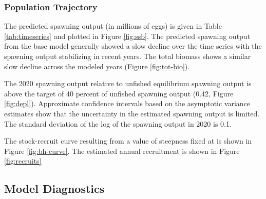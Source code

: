 \documentclass[11pt,
  english,
  a4paper,
]{article}
\begin{document}
\leavevmode\tagmcend\tagstructend\par


\hypertarget{population-trajectory}{%
\subsubsection{Population Trajectory}\label{population-trajectory}}

\leavevmode\tagmcend\tagstructend


The predicted spawning output (in millions of eggs) is given in Table \ref{tab:timeseries} and plotted in Figure \ref{fig:ssb}. The predicted spawning output from the base model generally showed a slow decline over the time series with the spawning output stabilizing in recent years. The total biomass shows a similar slow decline across the modeled years (Figure \ref{fig:tot-bio}).

\leavevmode\tagmcend\tagstructend\par


The 2020 spawning output relative to unfished equilibrium spawning output is above the target of 40 percent of unfished spawning output (0.42, Figure \ref{fig:depl}). Approximate confidence intervals based on the asymptotic variance estimates show that the uncertainty in the estimated spawning output is limited. The standard deviation of the log of the spawning output in 2020 is 0.1.

\leavevmode\tagmcend\tagstructend\par


The stock-recruit curve resulting from a value of steepness fixed at is shown in Figure \ref{fig:bh-curve}. The estimated annual recruitment is shown in Figure \ref{fig:recruits}

\leavevmode\tagmcend\tagstructend\par


\hypertarget{model-diagnostics}{%
\subsection{Model Diagnostics}\label{model-diagnostics}}
\end{document}
